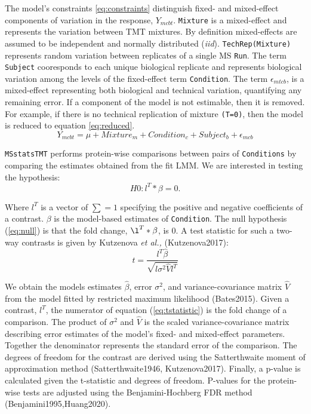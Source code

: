 \documentclass[11pt]{elife}
\begin{document}
The model's constraints \ref{eq:constraints} distinguish fixed- and mixed-effect
components of variation in the response, $Y_{mcbt}$. \texttt{Mixture} is a
mixed-effect and represents the variation between TMT mixtures. By definition
mixed-effects are assumed to be independent and normally distributed
(\textit{iid}). \texttt{TechRep(Mixture)} represents random variation between
replicates of a single MS \texttt{Run}.  The term \texttt{Subject} cooresponds
to each unique biological replicate and represents biological variation among
the levels of the fixed-effect term \texttt{Condition}. The term
$\epsilon_{mtcb}$, is a mixed-effect representing both biological and technical
variation, quantifying any remaining error. If a component of the model is not
estimable, then it is removed.  For example, if there is no technical
replication of mixture \texttt{(T=0)}, 
then the model is reduced to equation \ref{eq:reduced}.
\begin{equation} %
	\label{eq:reduced} %
	Y_{mcbt} = \mu + Mixture_m + Condition_c + Subject_b + \epsilon_{mcb}
\end{equation}

\texttt{MSstatsTMT} performs protein-wise comparisons between pairs of 
\texttt{Conditions} by comparing the estimates obtained from the fit LMM. 
We are interested in testing the hypothesis:
\begin{equation}
	\label{eq:null} %
	H0 : l^T * \beta = 0. 
\end{equation}

Where $l^T$ is a vector of $\sum=1$ specifying the positive and negative
coefficients of a contrast. $\beta$ is the model-based estimates of
\texttt{Condition}.  The null hypothesis (\ref{eq:null}) is that the fold
change, $\l^T * \beta$, is 0.  A test statistic for such a two-way contrasts is
given by Kutzenova \textit{et al.,} (Kutzenova2017):
\begin{equation} 
	\label{eq:tstatistic} %
	t = \frac{l^T \hat{\beta}}{\sqrt{l \sigma^2 \hat{V} l^T}}
\end{equation}

We obtain the models estimates $\hat{\beta}$, error $\sigma^2$, and
variance-covariance matrix $\hat{V}$ from the model fitted by restricted maximum
likelihood (Bates2015). Given a contrast, $l^T$, the numerator of equation
(\ref{eq:tstatistic}) is the fold change of a comparison.  The product of
$\sigma^2$ and $\hat{V}$ is the scaled variance-covariance matrix describing
error estimates of the model's fixed- and mixed-effect parameters.  Together the
denominator represents the standard error of the comparison. The degrees of
freedom for the contrast are derived using the Satterthwaite moment of
approximation method (Satterthwaite1946, Kutzenova2017).  Finally, a p-value is
calculated given the t-statistic and degrees of freedom.  P-values for the
protein-wise tests are adjusted using the Benjamini-Hochberg FDR method
(Benjamini1995,Huang2020).\\
\end{document}
